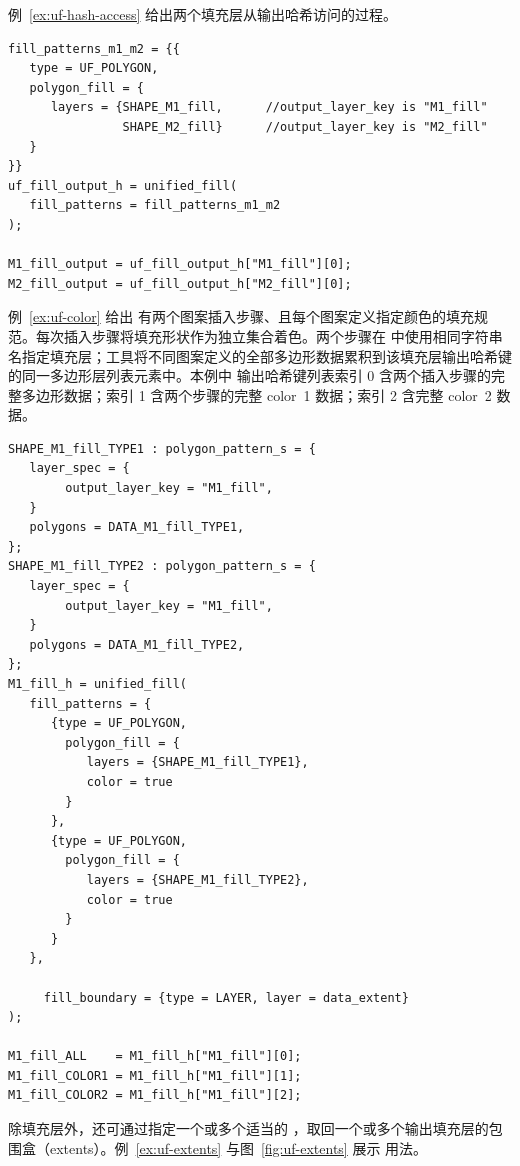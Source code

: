 例~\ref{ex:uf-hash-access} 给出两个填充层从输出哈希访问的过程。

\begin{lstlisting}[style=pxl,caption={从哈希访问填充层},label={ex:uf-hash-access}]
fill_patterns_m1_m2 = {{
   type = UF_POLYGON,
   polygon_fill = {
      layers = {SHAPE_M1_fill,      //output_layer_key is "M1_fill"
                SHAPE_M2_fill}      //output_layer_key is "M2_fill"
   }
}}
uf_fill_output_h = unified_fill(
   fill_patterns = fill_patterns_m1_m2
);

M1_fill_output = uf_fill_output_h["M1_fill"][0];
M2_fill_output = uf_fill_output_h["M2_fill"][0];
\end{lstlisting}

例~\ref{ex:uf-color} 给出  有两个图案插入步骤、且每个图案定义指定颜色的填充规范。每次插入步骤将填充形状作为独立集合着色。两个步骤在  中使用相同字符串名指定填充层；工具将不同图案定义的全部多边形数据累积到该填充层输出哈希键的同一多边形层列表元素中。本例中  输出哈希键列表索引 0 含两个插入步骤的完整多边形数据；索引 1 含两个步骤的完整 color~1 数据；索引 2 含完整 color~2 数据。

\begin{lstlisting}[style=pxl,caption={使用 color 选项的图案插入},label={ex:uf-color}]
SHAPE_M1_fill_TYPE1 : polygon_pattern_s = {
   layer_spec = {
        output_layer_key = "M1_fill",
   }
   polygons = DATA_M1_fill_TYPE1,
};
SHAPE_M1_fill_TYPE2 : polygon_pattern_s = {
   layer_spec = {
        output_layer_key = "M1_fill",
   }
   polygons = DATA_M1_fill_TYPE2,
};
M1_fill_h = unified_fill(
   fill_patterns = {
      {type = UF_POLYGON,
        polygon_fill = {
           layers = {SHAPE_M1_fill_TYPE1},
           color = true
        }
      },
      {type = UF_POLYGON,
        polygon_fill = {
           layers = {SHAPE_M1_fill_TYPE2},
           color = true
        }
      }
   },

     fill_boundary = {type = LAYER, layer = data_extent}
);

M1_fill_ALL    = M1_fill_h["M1_fill"][0];
M1_fill_COLOR1 = M1_fill_h["M1_fill"][1];
M1_fill_COLOR2 = M1_fill_h["M1_fill"][2];
\end{lstlisting}

除填充层外，还可通过指定一个或多个适当的 ，取回一个或多个输出填充层的包围盒（extents）。例~\ref{ex:uf-extents} 与图~\ref{fig:uf-extents} 展示  用法。

